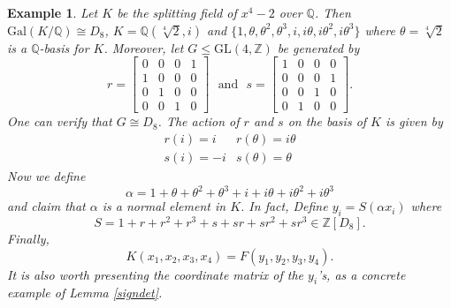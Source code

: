 \documentclass[12pt]{article}
\theoremstyle{plain}
\newtheorem{example}[theorem]{Example}
\newcommand{\Z}{\ensuremath{\mathbb{Z}}}
\newcommand{\Q}{\ensuremath{\mathbb{Q}}}
\begin{document}
\begin{example}
Let $K$ be the splitting field of $x^4-2$ over $\Q$. Then $\mathrm{Gal}(K/\Q) \cong D_8$, $K = \Q(\sqrt[4]{2},i)$ and $\lbrace 1, \theta, \theta^2, \theta^3, i, i\theta, i\theta^2, i\theta^3\rbrace$ where  $\theta = \sqrt[4]{2}$ is a $\Q$-basis for $K$. Moreover, let $G\leq \mathrm{GL}(4,\Z)$ be generated by 
$$
r = \begin{bmatrix}
0&0&0&1\\
1&0&0&0\\
0&1&0&0\\
0&0&1&0
\end{bmatrix} \,\,\,\, \text{and}\,\,\,\,
s = \begin{bmatrix}
1&0&0&0\\
0&0&0&1\\
0&0&1&0\\
0&1&0&0
\end{bmatrix}.
$$
One can verify that $G \cong D_8$. The action of $r$ and $s$ on the basis of $K$ is given by
$$
\begin{matrix}
r(i) = i &r(\theta) = i \theta \\
s(i) = -i & s(\theta) = \theta
\end{matrix}
$$
Now we define $$\alpha = 1+ \theta + \theta^2 + \theta^3 +i + i\theta + i\theta^2 + i\theta^3$$
and claim that $\alpha$ is a normal element in $K$. In fact, 
Define $y_i = S(\alpha x_i)$ where $$S = 1+r+r^2+r^3+s+sr+sr^2+sr^3 \in \Z[D_8].$$ Finally, $$K(x_1, x_2, x_3,x_4) = F(y_1,y_2,y_3,y_4).$$
It is also worth presenting the coordinate matrix of the $y_i$'s, as a concrete example of Lemma \ref{signdet}. 


\end{example}
\end{document}
